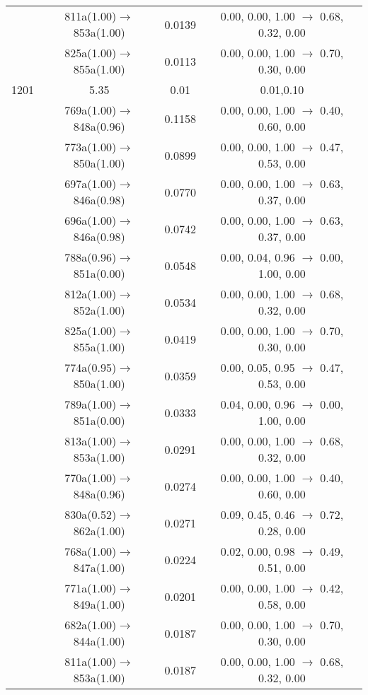 \documentclass[10pt,a4paper]{article}
\begin{document}
\begin{longtable}{c|c|c|c}
 	& 811a(1.00)$\rightarrow$853a(1.00) &	 0.0139 &	 0.00, 0.00, 1.00 $\rightarrow$ 0.68, 0.32, 0.00 \\ 
 	& 825a(1.00)$\rightarrow$855a(1.00) &	 0.0113 &	 0.00, 0.00, 1.00 $\rightarrow$ 0.70, 0.30, 0.00 \\ 
 \hline1201 &	 5.35 &	 0.01 &	 0.01,0.10 \\ 
  	& 769a(1.00)$\rightarrow$848a(0.96) &	 0.1158 &	 0.00, 0.00, 1.00 $\rightarrow$ 0.40, 0.60, 0.00 \\ 
 	& 773a(1.00)$\rightarrow$850a(1.00) &	 0.0899 &	 0.00, 0.00, 1.00 $\rightarrow$ 0.47, 0.53, 0.00 \\ 
 	& 697a(1.00)$\rightarrow$846a(0.98) &	 0.0770 &	 0.00, 0.00, 1.00 $\rightarrow$ 0.63, 0.37, 0.00 \\ 
 	& 696a(1.00)$\rightarrow$846a(0.98) &	 0.0742 &	 0.00, 0.00, 1.00 $\rightarrow$ 0.63, 0.37, 0.00 \\ 
 	& 788a(0.96)$\rightarrow$851a(0.00) &	 0.0548 &	 0.00, 0.04, 0.96 $\rightarrow$ 0.00, 1.00, 0.00 \\ 
 	& 812a(1.00)$\rightarrow$852a(1.00) &	 0.0534 &	 0.00, 0.00, 1.00 $\rightarrow$ 0.68, 0.32, 0.00 \\ 
 	& 825a(1.00)$\rightarrow$855a(1.00) &	 0.0419 &	 0.00, 0.00, 1.00 $\rightarrow$ 0.70, 0.30, 0.00 \\ 
 	& 774a(0.95)$\rightarrow$850a(1.00) &	 0.0359 &	 0.00, 0.05, 0.95 $\rightarrow$ 0.47, 0.53, 0.00 \\ 
 	& 789a(1.00)$\rightarrow$851a(0.00) &	 0.0333 &	 0.04, 0.00, 0.96 $\rightarrow$ 0.00, 1.00, 0.00 \\ 
 	& 813a(1.00)$\rightarrow$853a(1.00) &	 0.0291 &	 0.00, 0.00, 1.00 $\rightarrow$ 0.68, 0.32, 0.00 \\ 
 	& 770a(1.00)$\rightarrow$848a(0.96) &	 0.0274 &	 0.00, 0.00, 1.00 $\rightarrow$ 0.40, 0.60, 0.00 \\ 
 	& 830a(0.52)$\rightarrow$862a(1.00) &	 0.0271 &	 0.09, 0.45, 0.46 $\rightarrow$ 0.72, 0.28, 0.00 \\ 
 	& 768a(1.00)$\rightarrow$847a(1.00) &	 0.0224 &	 0.02, 0.00, 0.98 $\rightarrow$ 0.49, 0.51, 0.00 \\ 
 	& 771a(1.00)$\rightarrow$849a(1.00) &	 0.0201 &	 0.00, 0.00, 1.00 $\rightarrow$ 0.42, 0.58, 0.00 \\ 
 	& 682a(1.00)$\rightarrow$844a(1.00) &	 0.0187 &	 0.00, 0.00, 1.00 $\rightarrow$ 0.70, 0.30, 0.00 \\ 
 	& 811a(1.00)$\rightarrow$853a(1.00) &	 0.0187 &	 0.00, 0.00, 1.00 $\rightarrow$ 0.68, 0.32, 0.00 \\ 

\end{longtable}
\end{document}
